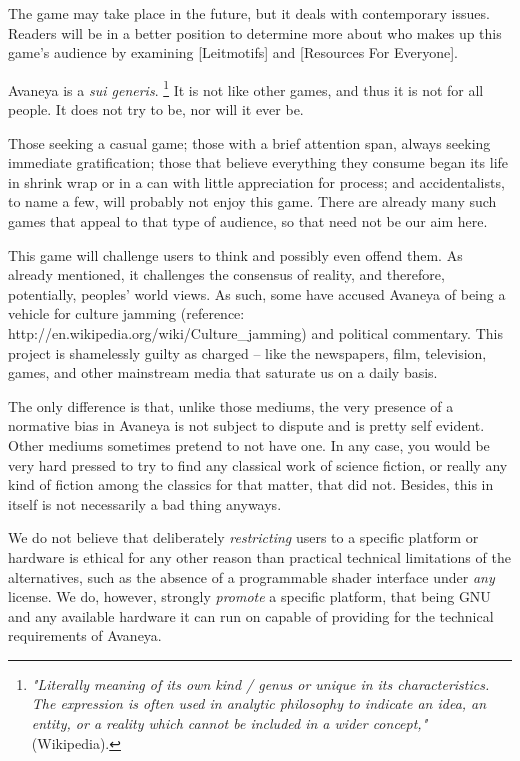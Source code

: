 The game may take place in the future, but it deals with contemporary issues. Readers will be in a better position to determine more about who makes up this game's audience by examining [Leitmotifs] and [Resources For Everyone].

Avaneya is a {\it sui generis}. \footnote{{\it "Literally meaning of its own kind / genus or unique in its characteristics. The expression is often used in analytic philosophy to indicate an idea, an entity, or a reality which cannot be included in a wider concept,"} (Wikipedia).} It is not like other games, and thus it is not for all people. It does not try to be, nor will it ever be.

Those seeking a casual game; those with a brief attention span, always seeking immediate gratification; those that believe everything they consume began its life in shrink wrap or in a can with little appreciation for process; and accidentalists, to name a few, will probably not enjoy this game. There are already many such games that appeal to that type of audience, so that need not be our aim here.

This game will challenge users to think and possibly even offend them. As already mentioned, it challenges the consensus of reality, and therefore, potentially, peoples' world views. As such, some have accused Avaneya of being a vehicle for culture jamming (reference: http://en.wikipedia.org/wiki/Culture_jamming) and political commentary. This project is shamelessly guilty as charged -- like the newspapers, film, television, games, and other mainstream media that saturate us on a daily basis. 

The only difference is that, unlike those mediums, the very presence of a normative bias in Avaneya is not subject to dispute and is pretty self evident. Other mediums sometimes pretend to not have one. In any case, you would be very hard pressed to try to find any classical work of science fiction, or really any kind of fiction among the classics for that matter, that did not. Besides, this in itself is not necessarily a bad thing anyways.

We do not believe that deliberately {\it restricting} users to a specific platform or hardware is ethical for any other reason than practical technical limitations of the alternatives, such as the absence of a programmable shader interface under {\it any} license. We do, however, strongly {\it promote} a specific platform, that being GNU and any available hardware it can run on capable of providing for the technical requirements of Avaneya.

